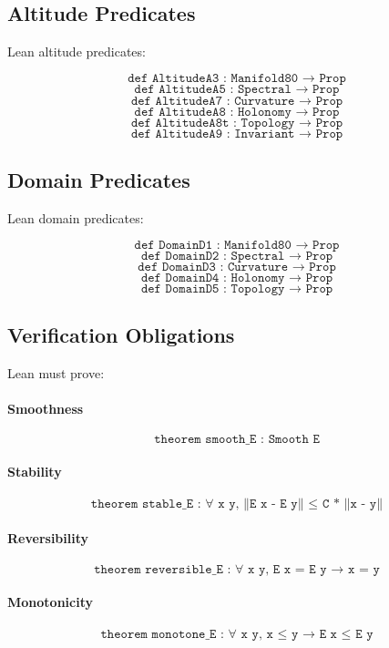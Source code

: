 \subsection{Altitude Predicates}

Lean altitude predicates:

\[
\texttt{def AltitudeA3 : Manifold80 → Prop}
\]
\[
\texttt{def AltitudeA5 : Spectral → Prop}
\]
\[
\texttt{def AltitudeA7 : Curvature → Prop}
\]
\[
\texttt{def AltitudeA8 : Holonomy → Prop}
\]
\[
\texttt{def AltitudeA8t : Topology → Prop}
\]
\[
\texttt{def AltitudeA9 : Invariant → Prop}
\]

\subsection{Domain Predicates}

Lean domain predicates:

\[
\texttt{def DomainD1 : Manifold80 → Prop}
\]
\[
\texttt{def DomainD2 : Spectral → Prop}
\]
\[
\texttt{def DomainD3 : Curvature → Prop}
\]
\[
\texttt{def DomainD4 : Holonomy → Prop}
\]
\[
\texttt{def DomainD5 : Topology → Prop}
\]

\subsection{Verification Obligations}

Lean must prove:

\paragraph{Smoothness}
\[
\texttt{theorem smooth\_E : Smooth E}
\]

\paragraph{Stability}
\[
\texttt{theorem stable\_E :
  ∀ x y, ∥E x - E y∥ ≤ C * ∥x - y∥}
\]

\paragraph{Reversibility}
\[
\texttt{theorem reversible\_E :
  ∀ x y, E x = E y → x = y}
\]

\paragraph{Monotonicity}
\[
\texttt{theorem monotone\_E :
  ∀ x y, x ≤ y → E x ≤ E y}
\]

